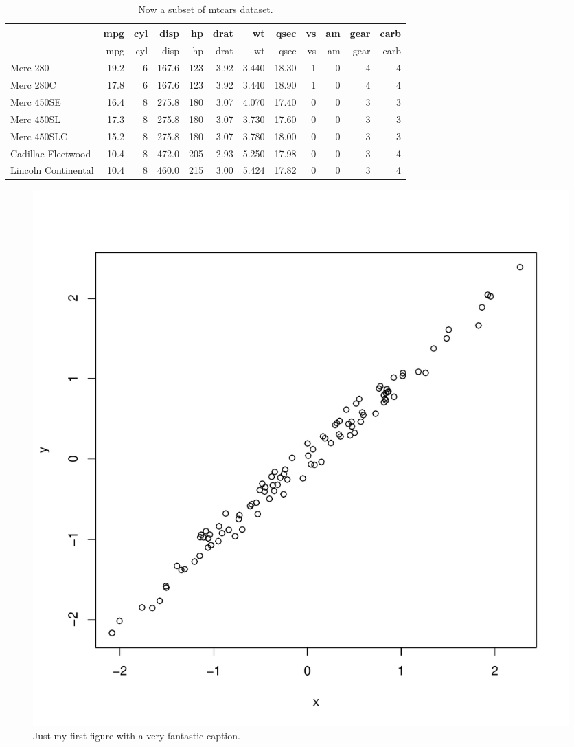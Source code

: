 \documentclass[11pt,a4paper]{article}
\begin{document}
\begin{longtable}[]{@{}lrrrrrrrrrrr@{}}
\caption{Now a subset of mtcars dataset.}\tabularnewline
\toprule
& mpg & cyl & disp & hp & drat & wt & qsec & vs & am & gear &
carb\tabularnewline
\midrule
\endfirsthead
\toprule
& mpg & cyl & disp & hp & drat & wt & qsec & vs & am & gear &
carb\tabularnewline
\midrule
\endhead
Merc 280 & 19.2 & 6 & 167.6 & 123 & 3.92 & 3.440 & 18.30 & 1 & 0 & 4 &
4\tabularnewline
Merc 280C & 17.8 & 6 & 167.6 & 123 & 3.92 & 3.440 & 18.90 & 1 & 0 & 4 &
4\tabularnewline
Merc 450SE & 16.4 & 8 & 275.8 & 180 & 3.07 & 4.070 & 17.40 & 0 & 0 & 3 &
3\tabularnewline
Merc 450SL & 17.3 & 8 & 275.8 & 180 & 3.07 & 3.730 & 17.60 & 0 & 0 & 3 &
3\tabularnewline
Merc 450SLC & 15.2 & 8 & 275.8 & 180 & 3.07 & 3.780 & 18.00 & 0 & 0 & 3
& 3\tabularnewline
Cadillac Fleetwood & 10.4 & 8 & 472.0 & 205 & 2.93 & 5.250 & 17.98 & 0 &
0 & 3 & 4\tabularnewline
Lincoln Continental & 10.4 & 8 & 460.0 & 215 & 3.00 & 5.424 & 17.82 & 0
& 0 & 3 & 4\tabularnewline
\bottomrule
\end{longtable}

\clearpage

\listoffigures

\newpage

\begin{figure}
\centering
\includegraphics{figures/Fig1-1.pdf}
\caption{Just my first figure with a very fantastic caption.}
\end{figure}
\end{document}
